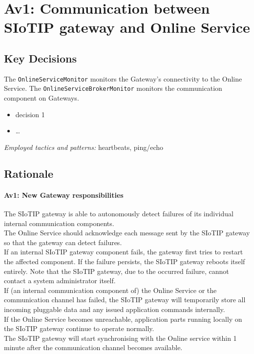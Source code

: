 \section{Av1: Communication between SIoTIP gateway and Online Service}


    \subsection*{Key Decisions}

        The \texttt{OnlineServiceMonitor} monitors the Gateway's connectivity to the Online Service.
        The \texttt{OnlineServiceBrokerMonitor} monitors the communication component on Gateways.

        \begin{itemize}
        	\item decision 1
        	\item \ldots
        \end{itemize}
        \emph{Employed tactics and patterns:} heartbeats, ping/echo


    \subsection*{Rationale}
        \paragraph{Av1: New Gateway responsibilities}
            The SIoTIP gateway is able to autonomously detect failures of its individual internal communication components.\\
            The Online Service should acknowledge each message sent by the SIoTIP gateway so that the gateway can detect failures.\\
            If an internal SIoTIP gateway component fails, the gateway first tries to restart the affected component.
            If the failure persists, the SIoTIP gateway reboots itself entirely. Note that the SIoTIP gateway,
            due to the occurred failure, cannot contact a system administrator itself.\\
            If (an internal communication component of) the Online Service or the communication
            channel has failed, the SIoTIP gateway will temporarily store all incoming pluggable data
            and any issued application commands internally.\\
            If the Online Service becomes unreachable, application parts running locally on the SIoTIP
            gateway continue to operate normally.\\
            The SIoTIP gateway will start synchronising with the Online service within 1 minute after the
            communication channel becomes available.\\
        
